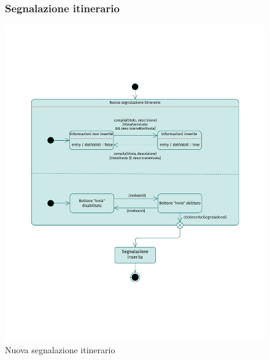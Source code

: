\documentclass{natourDoc}
\begin{document}
\begin{figure}[!htbp]
	\subsubsection{Segnalazione itinerario}
	\centering
	\includegraphics[width=\textwidth, page=1]{./diagrams/statechart.pdf}
	\caption{Nuova segnalazione itinerario}
\end{figure}
\FloatBarrier

\newpage
\end{document}
